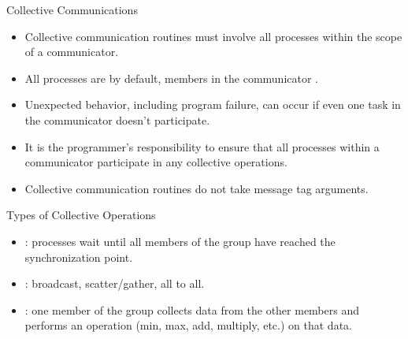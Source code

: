 \documentclass[9pt,c]{beamer}
\begin{document}
\begin{frame}{Collective Communications}
  \begin{itemize}
    \item Collective communication routines must involve all processes within the scope of a communicator. 
    \item All processes are by default, members in the communicator .
    \item Unexpected behavior, including program failure, can occur if even one task in the communicator doesn’t participate.
    \item It is the programmer’s responsibility to ensure that all processes within a communicator participate in any collective operations.
    \item Collective communication routines do not take message tag arguments.
  \end{itemize}
  
  \begin{block}{Types of Collective Operations}
    \begin{itemize}
      \item {}: processes wait until all members of the group have reached the synchronization point.
      \item {}: broadcast, scatter/gather, all to all.
      \item {}: one member of the group collects data from the other members and performs an operation (min, max, add, multiply, etc.) on that data.
    \end{itemize}
  \end{block}
\end{frame}
\end{document}
